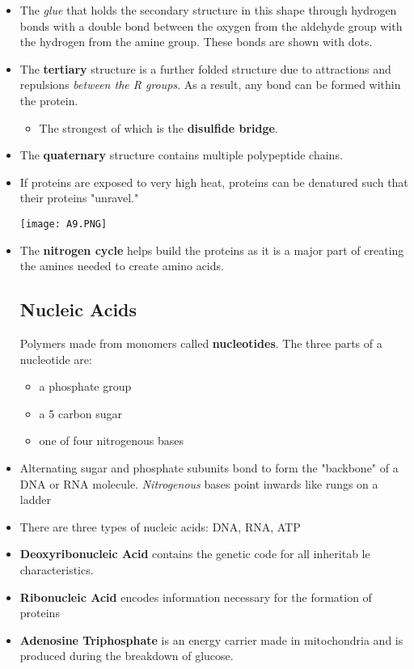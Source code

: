 \documentclass[letterpaper]{article}
\begin{document}
\begin{itemize}
\begin{multicols}{3}
\begin{itemize}
        \item random coil
    \end{itemize}
    \end{multicols}
    \item The \textit{glue} that holds the secondary structure in this shape through hydrogen bonds with a double bond between the oxygen from the aldehyde group with the hydrogen from the amine group. These bonds are shown with dots.
    \item The \textbf{tertiary} structure is a further folded structure due to attractions and repulsions \textit{between the R groups}. As a result, any bond can be formed within the protein.
    \begin{itemize}
        \item The strongest of which is the \textbf{disulfide bridge}.
    \end{itemize}
    \item The \textbf{quaternary} structure contains multiple polypeptide chains.
    \item If proteins are exposed to very high heat, proteins can be denatured such that their proteins "unravel."
    \begin{center}\texttt{[image: A9.PNG]}\end{center}
    \item The \textbf{nitrogen cycle} helps build the proteins as it is a major part of creating the amines needed to create amino acids.

    \subsection{Nucleic Acids}
    \begin{idea}
        Polymers made from monomers called \textbf{nucleotides}. The three parts of a nucleotide are:
        \begin{itemize}
            \item a phosphate group
            \item a 5 carbon sugar
            \item one of four nitrogenous bases
        \end{itemize}
    \end{idea}
    \item Alternating sugar and phosphate subunits bond to form the "backbone" of a DNA or RNA molecule. \textit{Nitrogenous} bases point inwards like rungs on a ladder
    \item There are three types of nucleic acids: DNA, RNA, ATP
    \item \textbf{Deoxyribonucleic Acid} contains the genetic code for all inheritab le characteristics.
    \item \textbf{Ribonucleic Acid} encodes information necessary for the formation of proteins
    \item \textbf{Adenosine Triphosphate} is an energy carrier made in mitochondria and is produced during the breakdown of glucose.
\end{itemize}
\newpage
\end{document}
